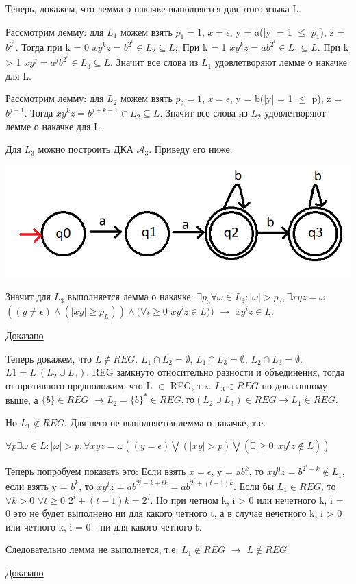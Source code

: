 \documentclass[a4paper,14pt]{article} %
\begin{document}
Теперь, докажем, что лемма о накачке выполняется для этого языка L.

Рассмотрим лемму: для $L_1$ можем взять $p_1 = 1$, $x = \epsilon$, y = a(|y| = 1 $\leqslant$ $p_1$),
z = $b^{2^i}$. Тогда при k = 0 $xy^kz = b^{2^i} \in L_2 \subseteq L;$
При k = 1 $xy^kz = ab^{2^i} \in L_1 \subseteq L$.
При k > 1 $xy^j = a^jb^{2^i} \in L_3 \subseteq L$. Значит все слова из $L_1$ удовлетворяют лемме о накачке для L.

Рассмотрим лемму: для $L_2$ можем взять $p_2 = 1$, $x = \epsilon$, y = b(|y| = 1 $\leqslant$ p), z = $b^{j-1}$.
Тогда $xy^kz = b^{j+k-1} \in L_2 \subseteq L$. Значит все слова из $L_2$ удовлетворяют лемме о накачке для L.

Для $L_3$ можно построить ДКА $\mathcal{A}_3$. Приведу его ниже:

\includegraphics{02.png}

Значит для $L_3$ выполняется лемма о накачке: $\exists p_3 \forall \omega \in L_3 : |\omega| > p_3, \exists xyz = \omega$
$((y \neq \epsilon) \wedge (|xy| \geqslant p_L)) \wedge (\forall i \geqslant 0$ $xy^iz \in L))$ $\rightarrow$ $xy^iz \in L$.

\underline{Доказано}

Теперь докажем, что $L \notin REG$.
$L_1 \cap L_2 = \emptyset$, $L_1 \cap L_3 = \emptyset$, $L_2 \cap L_3 = \emptyset$.
$L1 = L \ (L_2 \cup L_3)$.
REG замкнуто относительно разности и объединения, тогда от противного предположим, что L $\in$ REG, т.к. $L_3 \in REG$ по доказанному выше, а $\{b\} \in REG$ 
$\rightarrow L_2 = \{b\}^* \in REG, то (L_2 \cup L_3) \in REG \rightarrow L_1 \in REG.$

Но $L_1 \notin REG$.
Для него не выполняется лемма о накачке, т.е. 

$\forall p \exists \omega \in L : |\omega| > p, \forall xyz = \omega ((y = \epsilon) \bigvee (|xy| > p) \bigvee (\exists \geqslant 0 : xy^tz \notin L)) $

Теперь попробуем показать это:
Если взять $x = \epsilon$, y = a$b^k$, то $xy^0z = b^{2^i - k} \notin L_1$, если взять y = $b^k$, то $xy^iz = ab^{2^i - k + tk} = ab^{2^i + (t-1)k}$.
Если бы $L_1 \in REG$, то $\forall k > 0$ $\forall t \geqslant 0$ $2^i + (t-1)k = 2^j$. Но при четном k, i > 0 или нечетного k, i = 0 это не будет выполнено ни для какого четного t, а в случае нечетного k, i > 0 или четного k, i = 0 - ни для какого четного t.

Следовательно лемма не выполнется, т.е. $L_1 \notin REG$ $\rightarrow$ $L \notin REG$

\underline{Доказано}
\end{document}
